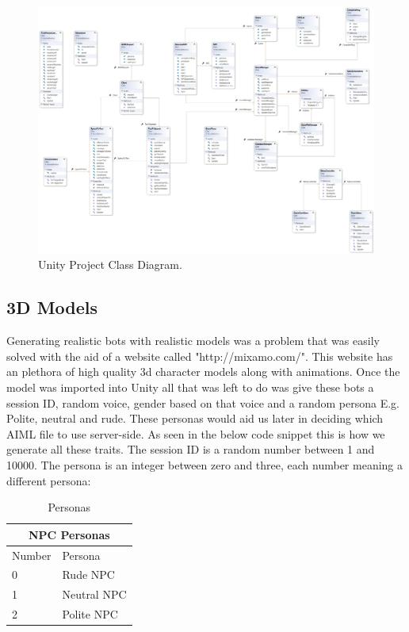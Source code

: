 \begin{figure}[h!]
	\caption{Unity Project Class Diagram.}
	\label{image:ClassDiagram}
	\centering
	\includegraphics[width=1\textwidth]{Images/ClassDiagram.png}
\end{figure}

\subsection{3D Models}
Generating realistic bots with realistic models was a problem that was easily solved with the aid of a website called "http://mixamo.com/". This website has an plethora of high quality 3d character models along with animations. Once the model was imported into Unity all that was left to do was give these bots a session ID, random voice, gender based on that voice and a random persona E.g. Polite, neutral and rude. These personas would aid us later in deciding which AIML file to use server-side. As seen in the below code snippet this is how we generate all these traits. The session ID is a random number between 1 and 10000. The persona is an integer between zero and three, each number meaning a different persona: 

\begin{table}[!ht]
    \centering
\begin{tabular}{ |p{3cm}|p{5cm}|  }
\hline
\multicolumn{2}{|c|}{NPC Personas} \\
\hline
Number & Persona \\
\hline
0 & Rude NPC \\
\hline
1 & Neutral NPC \\
\hline
2 & Polite NPC \\
\hline

\end{tabular}
    \caption{Personas}
    \label{tab:my_label}
\end{table}



